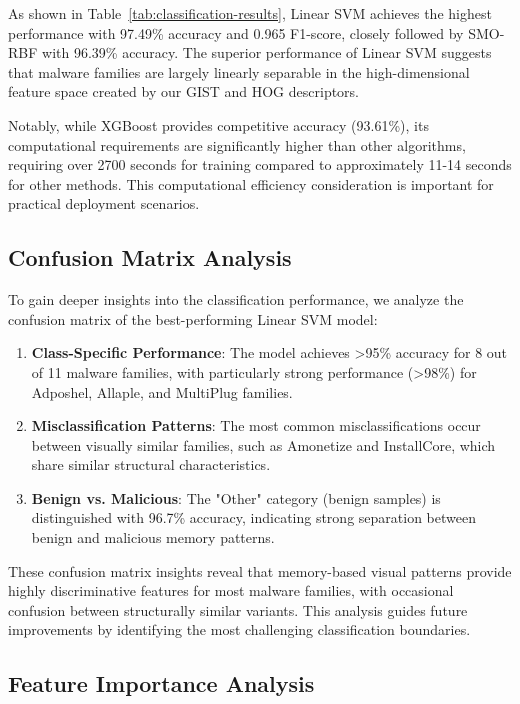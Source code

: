 As shown in Table~\ref{tab:classification-results}, Linear SVM achieves the highest performance with 97.49\% accuracy and 0.965 F1-score, closely followed by SMO-RBF with 96.39\% accuracy. The superior performance of Linear SVM suggests that malware families are largely linearly separable in the high-dimensional feature space created by our GIST and HOG descriptors.

Notably, while XGBoost provides competitive accuracy (93.61\%), its computational requirements are significantly higher than other algorithms, requiring over 2700 seconds for training compared to approximately 11-14 seconds for other methods. This computational efficiency consideration is important for practical deployment scenarios.

\subsection{Confusion Matrix Analysis}
\label{subsec:confusion-matrix}

To gain deeper insights into the classification performance, we analyze the confusion matrix of the best-performing Linear SVM model:

\begin{enumerate}
    \item \textbf{Class-Specific Performance}: The model achieves >95\% accuracy for 8 out of 11 malware families, with particularly strong performance (>98\%) for Adposhel, Allaple, and MultiPlug families.
    
    \item \textbf{Misclassification Patterns}: The most common misclassifications occur between visually similar families, such as Amonetize and InstallCore, which share similar structural characteristics.
    
    \item \textbf{Benign vs. Malicious}: The "Other" category (benign samples) is distinguished with 96.7\% accuracy, indicating strong separation between benign and malicious memory patterns.
\end{enumerate}

These confusion matrix insights reveal that memory-based visual patterns provide highly discriminative features for most malware families, with occasional confusion between structurally similar variants. This analysis guides future improvements by identifying the most challenging classification boundaries.

\subsection{Feature Importance Analysis}
\label{subsec:feature-importance}

